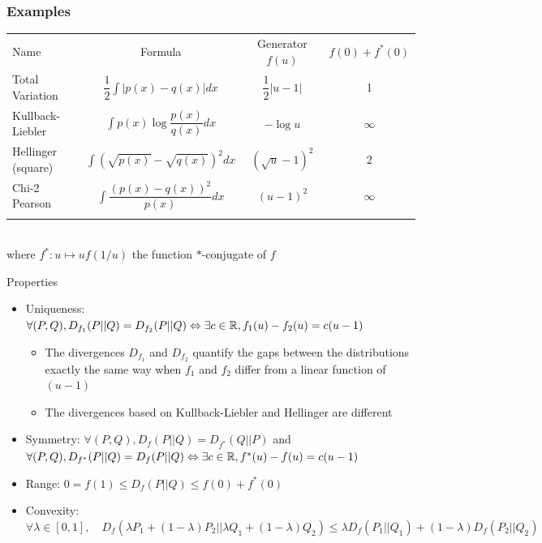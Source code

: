 \documentclass[8pt]{beamer}
\begin{document}
\begin{frame}
  \frametitle{Examples}
\small
\centering
      \begin{tabular}{lccc}
        \hline\noalign{\smallskip}
        Name & Formula & Generator $f(u)$ & $f(0)+f^*(0)$ \\
        \noalign{\smallskip}\hline\noalign{\smallskip}
        Total Variation & $\displaystyle\dfrac{1}{2}\int|p(x)-q(x)|dx$ & $\displaystyle\dfrac{1}{2}|u-1|$ & 1 \\
        Kullback-Liebler & $\displaystyle\int p(x)\log\dfrac{p(x)}{q(x)}dx$ & $\displaystyle-\log u$ & $\infty$ \\
        Hellinger (square) & $\displaystyle\int\left(\sqrt{p(x)}-\sqrt{q(x)}\right)^2dx$ & $\displaystyle\left(\sqrt{u}-1\right)^2$ & 2 \\
        Chi-2 Pearson & $\displaystyle\int\dfrac{\left(p(x)-q(x)\right)^2}{p(x)}dx$ & $\displaystyle(u-1)^2$ & $\infty$ \\
        \noalign{\smallskip}\hline \\[0.5em]
      \end{tabular}
 \\
 where $f^*:u\mapsto uf(1/u)$ the function $*$-conjugate of $f$
\begin{block}{Properties}
  \begin{itemize}
  \item Uniqueness: $\forall (P,Q), D_{f_1}(P||Q)=D_{f_2}(P||Q) \Leftrightarrow \exists c\in{\mathbb R}, f_1(u)-f_2(u)=c(u-1)$ 
  \begin{itemize}
  \item The divergences $D_{f_1}$ and $D_{f_2}$  quantify the gaps between the distributions  exactly the same way when  $f_1$ and $f_2$ differ from a linear function of $(u-1)$
  \item The divergences based on Kullback-Liebler and Hellinger are different
  \end{itemize}
  \item Symmetry: $\forall (P,Q), D_{f}(P||Q)=D_{f^*}(Q||P)$ and $\forall (P,Q),D_{f^*}(P||Q)=D_{f}(P||Q)\Leftrightarrow \exists c\in{\mathbb R}, f^*(u)-f(u)=c(u-1)$
  \item Range: \alert{$\displaystyle 0=f(1)\leq D_f(P||Q)\leq f(0)+f^*(0)$}
  \item Convexity: $\displaystyle \forall \lambda\in[0,1],\quad D_f(\lambda P_1+(1-\lambda)P_2||\lambda Q_1+(1-\lambda)Q_2)\leq\lambda D_f(P_1||Q_1)+(1-\lambda)D_f(P_2||Q_2)$
  \end{itemize}
  \end{block}

  \end{frame}
\end{document}
